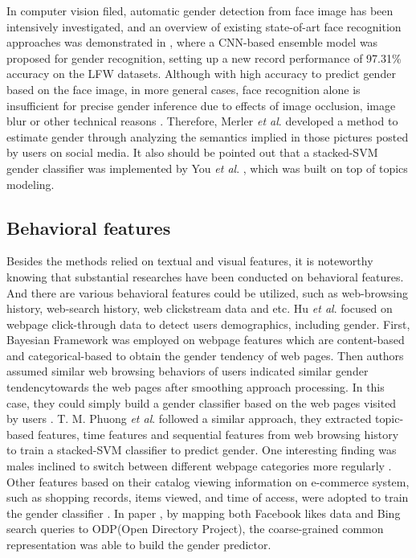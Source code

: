 \documentclass[runningheads]{llncs}
\begin{document}
	In computer vision filed, automatic gender detection from face image has been intensively investigated, and an overview of existing state-of-art face recognition approaches was demonstrated in \cite{antipov2016minimalistic}, where a CNN-based ensemble model was proposed for gender recognition, setting up a new record performance of 97.31\% accuracy on the LFW datasets. Although with high accuracy to predict gender based on the face image, in more general cases, face recognition alone is insufficient for precise gender inference due to effects of image occlusion, image blur or other technical reasons \cite{merler2015you}. Therefore, Merler \textit{et al}. developed a method to estimate gender through analyzing the semantics implied in those pictures posted by users on social media. It also should be pointed out that a stacked-SVM gender classifier was implemented by You \textit{et al}. \cite{you2014eyes}, which was built on top of topics modeling.
	
	\subsection{Behavioral features}
	
	Besides the methods relied on textual and visual features, it is noteworthy knowing that substantial researches have been conducted on behavioral features. And there are various behavioral features could be utilized, such as web-browsing history, web-search history, web clickstream data and etc. Hu \textit{et al}. focused on webpage click-through data to detect user\textquotesingle s demographics, including gender. First, Bayesian Framework was employed on webpage features which are content-based and categorical-based to obtain the gender tendency of web pages. Then authors assumed similar web browsing behaviors of users indicated similar gender tendencytowards the web pages after smoothing approach processing. In this case, they could simply build a gender classifier based on the web pages visited by users \cite{hu2007demographic}. T. M. Phuong \textit{et al}. followed a similar approach, they extracted topic-based features, time features and sequential features from web browsing history to train a stacked-SVM classifier to predict gender. One interesting finding was males inclined to switch between different webpage categories more regularly \cite{phuong2014gender}. Other features based on their catalog viewing information on e-commerce system, such as shopping records, items viewed, and time of access, were adopted to train the gender classifier \cite{duong2016customer}. In paper \cite{bi2013inferring}, by mapping both Facebook likes data and Bing search queries to ODP(Open Directory Project), the coarse-grained common representation was able to build the gender predictor.
	
\end{document}
